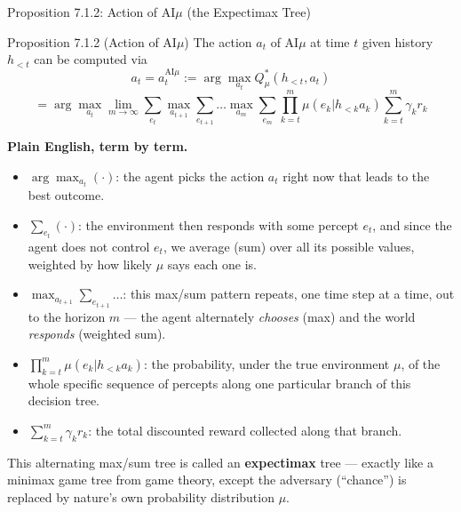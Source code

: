 \documentclass[aspectratio=169,10pt]{beamer}
\begin{document}
\begin{frame}[allowframebreaks]{Proposition 7.1.2: Action of AI$\mu$ (the Expectimax Tree)}
  \begin{block}{Proposition 7.1.2 (Action of AI$\mu$)}
    The action $a_t$ of AI$\mu$ at time $t$ given history $h_{<t}$ can be
    computed via
    \[
      a_t = a_t^{\mathrm{AI}\mu} := \arg\max_{a_t} Q_\mu^*(h_{<t},a_t)
    \]
    \[
      = \arg\max_{a_t}\lim_{m\to\infty}\sum_{e_t}\max_{a_{t+1}}\sum_{e_{t+1}}
      \dots \max_{a_m}\sum_{e_m}\prod_{k=t}^m\mu(e_k|h_{<k}a_k)
      \sum_{k=t}^m\gamma_k r_k
    \]
  \end{block}
  \textbf{Plain English, term by term.}
  \begin{itemize}
    \item $\arg\max_{a_t}(\cdot)$: the agent picks the action $a_t$ right
      now that leads to the best outcome.
    \item $\sum_{e_t}(\cdot)$: the environment then responds with some
      percept $e_t$, and since the agent does not control $e_t$, we average
      (sum) over all its possible values, weighted by how likely $\mu$ says
      each one is.
    \item $\max_{a_{t+1}}\sum_{e_{t+1}}\dots$: this max/sum pattern repeats,
      one time step at a time, out to the horizon $m$ --- the agent
      alternately \emph{chooses} (max) and the world \emph{responds}
      (weighted sum).
    \item $\prod_{k=t}^m\mu(e_k|h_{<k}a_k)$: the probability, under the true
      environment $\mu$, of the whole specific sequence of percepts along
      one particular branch of this decision tree.
    \item $\sum_{k=t}^m\gamma_k r_k$: the total discounted reward collected
      along that branch.
  \end{itemize}
  This alternating max/sum tree is called an \textbf{expectimax} tree ---
  exactly like a minimax game tree from game theory, except the adversary
  (``chance'') is replaced by nature's own probability distribution $\mu$.
\end{frame}
\end{document}
